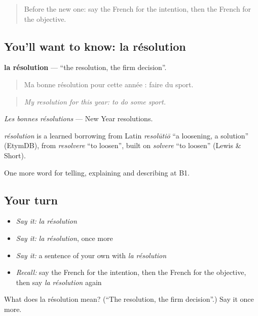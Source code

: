 \begin{quote}
Before the new one: say the French for the intention, then the French for the objective.
\end{quote}

\subsection*{You'll want to know: la résolution}
\textbf{la résolution} — \textquotedblleft{}the resolution, the firm decision\textquotedblright{}.

\begin{quote}
Ma bonne résolution pour cette année : faire du sport.
\end{quote}

\begin{quote}
\emph{My resolution for this year: to do some sport.}
\end{quote}

\emph{Les bonnes résolutions} — New Year resolutions.

\begin{cousinweb}
\emph{résolution} is a learned borrowing from Latin \emph{resolūtiō} \textquotedblleft{}a loosening, a solution\textquotedblright{} (EtymDB), from \emph{resolvere} \textquotedblleft{}to loosen\textquotedblright{}, built on \emph{solvere} \textquotedblleft{}to loosen\textquotedblright{} (Lewis \& Short).
\end{cousinweb}

\begin{grammarlens}[title={What you've built}]
One more word for telling, explaining and describing at B1.
\end{grammarlens}

\subsection*{Your turn}
\begin{itemize}
\raggedright
  \item \emph{Say it:} \emph{la résolution}
  \item \emph{Say it:} \emph{la résolution}, once more
  \item \emph{Say it:} a sentence of your own with \emph{la résolution}
  \item \emph{Recall:} say the French for the intention, then the French for the objective, then say \emph{la résolution} again
\end{itemize}

\begin{tcolorbox}[breakable,colback=teal!4,colframe=teal!35!black,title={Before you move on}]
What does la résolution mean? (\textquotedblleft{}The resolution, the firm decision\textquotedblright{}.) Say it once more.
\end{tcolorbox}
